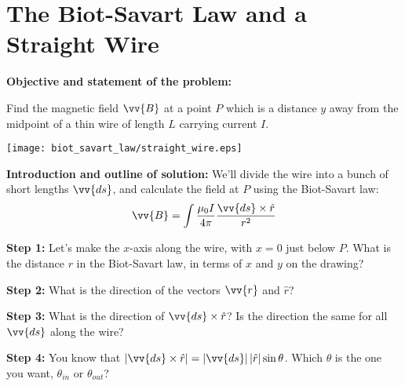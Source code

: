 \section{The Biot-Savart Law and a Straight Wire}

\begin{comment}
This "lab" is by Matt Trawick, 10/2015.  
\end{comment}

\makelabheader %

\vspace{0.5cm}

\textbf{Objective and statement of the problem:}

Find the magnetic field $\vv{B}$ at a point $P$ which is a distance $y$ away from the midpoint of a thin wire of length $L$ carrying current $I$.
\begin{center}
    \texttt{[image: biot\_savart\_law/straight\_wire.eps]}
\end{center}

\textbf{Introduction and outline of solution:}
We'll divide the wire into a bunch of short lengths $\vv{ds}$, and calculate the field at $P$ using the Biot-Savart law:
\begin{displaymath}
\vv{B} = \int{\frac{\mu_0I}{4 \pi}\frac{\vv{ds}\times \hat{r}}{r^2}}
\end{displaymath}

\textbf{Step 1:} \newline
Let's make the $x$-axis along the wire, with $x=0$ just below $P$.  What is the distance $r$ in the Biot-Savart law, in terms of $x$ and $y$ on the drawing?

\vspace{.6in}


\textbf{Step 2:} \newline
What is the direction of the vectors $\vv{r}$ and $\hat{r}$?



\vspace{.6in}

\textbf{Step 3:} \newline
What is the direction of  $\vv{ds}\times \hat{r}$?  Is the direction the same for all $\vv{ds}$ along the wire? 

\vspace{.6in}


\textbf{Step 4:} \newline
You know that $\left|\vv{ds}\times \hat{r}\right|=\left|\vv{ds}\right|  \left|\hat{r}\right|\sin\theta$.  Which $\theta$ is the one you want, $\theta_{in}$ or $\theta_{out}$?

